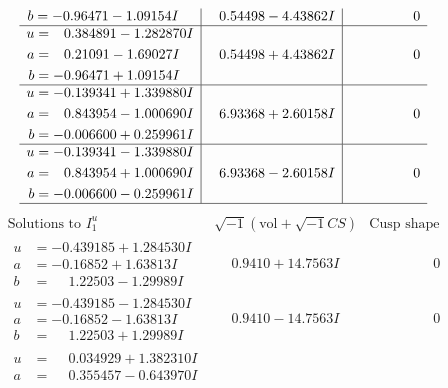 \documentclass[1p]{elsarticle_modified}
\theoremstyle{definition}
\newcommand{\I}{\sqrt{-1}}
\begin{document}
$$\begin{array}{c|c|c}
\begin{aligned}
b &= -0.96471 - 1.09154 I\end{aligned}
 & \phantom{-}0.54498 - 4.43862 I & \phantom{-0.000000 } 0 \\ \hline\begin{aligned}
u &= \phantom{-}0.384891 - 1.282870 I \\
a &= \phantom{-}0.21091 - 1.69027 I \\
b &= -0.96471 + 1.09154 I\end{aligned}
 & \phantom{-}0.54498 + 4.43862 I & \phantom{-0.000000 } 0 \\ \hline\begin{aligned}
u &= -0.139341 + 1.339880 I \\
a &= \phantom{-}0.843954 - 1.000690 I \\
b &= -0.006600 + 0.259961 I\end{aligned}
 & \phantom{-}6.93368 + 2.60158 I & \phantom{-0.000000 } 0 \\ \hline\begin{aligned}
u &= -0.139341 - 1.339880 I \\
a &= \phantom{-}0.843954 + 1.000690 I \\
b &= -0.006600 - 0.259961 I\end{aligned}
 & \phantom{-}6.93368 - 2.60158 I & \phantom{-0.000000 } 0\\
 \hline 
 \end{array}$$\newpage$$\begin{array}{c|c|c}  
\text{Solutions to }I^u_{1}& \I (\text{vol} + \sqrt{-1}CS) & \text{Cusp shape}\\
 \hline 
\begin{aligned}
u &= -0.439185 + 1.284530 I \\
a &= -0.16852 + 1.63813 I \\
b &= \phantom{-}1.22503 - 1.29989 I\end{aligned}
 & \phantom{-}0.9410 + 14.7563 I & \phantom{-0.000000 } 0 \\ \hline\begin{aligned}
u &= -0.439185 - 1.284530 I \\
a &= -0.16852 - 1.63813 I \\
b &= \phantom{-}1.22503 + 1.29989 I\end{aligned}
 & \phantom{-}0.9410 - 14.7563 I & \phantom{-0.000000 } 0 \\ \hline\begin{aligned}
u &= \phantom{-}0.034929 + 1.382310 I \\
a &= \phantom{-}0.355457 - 0.643970 I \\

\end{aligned}
\end{array}$$
\end{document}
